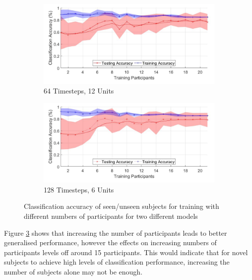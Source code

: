 \documentclass[sensors,article,submit,moreauthors,pdftex]{Definitions/mdpi}
\begin{document}
\begin{figure}[!htb]
    \centering
    \begin{subfigure}[b]{0.49\textwidth}
         \centering
        \includegraphics[width=\textwidth]{Figures/results/number_participants_64x12.jpg}
        \caption{64 Timesteps, 12 Units}
        \label{fig:subject_num_generalisation_64x12}
    \end{subfigure}
    \hfil
    \begin{subfigure}[b]{0.49\textwidth}
         \centering
        \includegraphics[width=\textwidth]{Figures/results/number_participants_128x6.jpg}
        \caption{128 Timesteps, 6 Units}
        \label{fig:subject_num_generalisation_128x6}
    \end{subfigure}
    \caption{Classification accuracy of seen/unseen subjects for training with different numbers of participants for two different models}
    \label{fig:subject_num_generalisation}
\end{figure}

Figure \ref{fig:subject_num_generalisation} shows that increasing the number of participants leads to better generalised performance, however the effects on increasing numbers of participants levels off around 15 participants. This would indicate that for novel subjects to achieve high levels of classification performance, increasing the number of subjects alone may not be enough.
\end{document}
